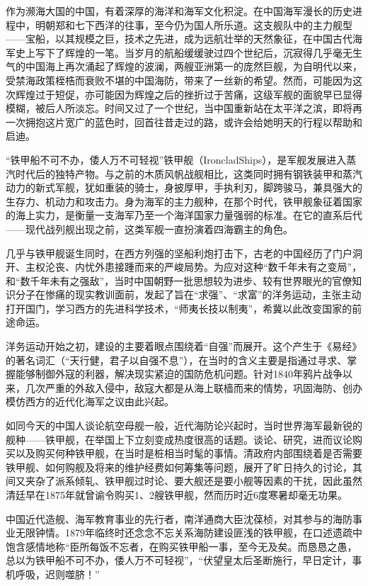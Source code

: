 \documentclass[12pt,UTF8]{ctexbook}
\begin{document}
作为濒海大国的中国，有着深厚的海洋和海军文化积淀。在中国海军漫长的历史进程中，明朝郑和七下西洋的往事，至今仍为国人所乐道。这支舰队中的主力舰型——宝船，以其规模之巨，技术之先进，成为远航壮举的天然象征，在中国古代海军史上写下了辉煌的一笔。当岁月的航船缓缓驶过四个世纪后，沉寂得几乎毫无生气的中国海上再次涌起了辉煌的波澜，两艘亚洲第一的庞然巨舰，为自明代以来，受禁海政策桎梏而衰败不堪的中国海防，带来了一丝新的希望。然而，可能因为这次辉煌过于短促，亦可能因为辉煌之后的挫折过于苦痛，这级军舰的面貌早已显得模糊，被后人所淡忘。时间又过了一个世纪，当中国重新站在太平洋之滨，即将再一次拥抱这片宽广的蓝色时，回首往昔走过的路，或许会给她明天的行程以帮助和启迪。

“铁甲船不可不办，倭人万不可轻视”铁甲舰（IroncladShips），是军舰发展进入蒸汽时代后的独特产物。与之前的木质风帆战舰相比，这类同时拥有钢铁装甲和蒸汽动力的新式军舰，犹如重装的骑士，身披厚甲，手执利刃，脚跨骏马，兼具强大的生存力、机动力和攻击力。身为海军的主力舰种，在那个时代，铁甲舰象征着国家的海上实力，是衡量一支海军乃至一个海洋国家力量强弱的标准。在它的直系后代——现代战列舰出现之前，这类军舰一直扮演着四海霸主的角色。

几乎与铁甲舰诞生同时，在西方列强的坚船利炮打击下，古老的中国经历了门户洞开、主权沦丧、内忧外患接踵而来的严峻局势。为应对这种“数千年未有之变局”，和“数千年未有之强敌”，当时中国朝野一批思想较为进步、较有世界眼光的官僚知识分子在惨痛的现实教训面前，发起了旨在“求强”、“求富”的洋务运动，主张主动打开国门，学习西方的先进科学技术，“师夷长技以制夷”，希冀以此改变国家的前途命运。

洋务运动开始之初，建设的主要着眼点围绕着“自强”而展开。这个产生于《易经》的著名词汇（“天行健，君子以自强不息”），在当时的含义主要是指通过寻求、掌握能够制御外寇的利器，解决现实紧迫的国防危机问题。针对1840年鸦片战争以来，几次严重的外敌入侵中，敌寇大都是从海上联樯而来的情势，巩固海防、创办模仿西方的近代化海军之议由此兴起。

如同今天的中国人谈论航空母舰一般，近代海防论兴起时，当时世界海军最新锐的舰种——铁甲舰，在举国上下立刻变成热度很高的话题。谈论、研究，进而议论购买以及购买何种铁甲舰，在当时是桩相当时髦的事情。清政府内部围绕着是否需要铁甲舰、如何购舰及将来的维护经费如何筹集等问题，展开了旷日持久的讨论，其间又夹杂了派系倾轧、铁甲舰过时论、要大舰还是要小舰等因素的干扰，因此虽然清廷早在1875年就曾谕令购买1、2艘铁甲舰，然而历时近6度寒暑却毫无功果。

中国近代造舰、海军教育事业的先行者，南洋通商大臣沈葆桢，对其参与的海防事业无限钟情。1879年临终时还念念不忘关系海防建设匪浅的铁甲舰，在口述遗疏中饱含感情地称“臣所每饭不忘者，在购买铁甲船一事，至今无及矣。而恳恳之愚，总以为铁甲船不可不办，倭人万不可轻视”，“伏望皇太后圣断施行，早日定计，事机呼吸，迟则噬脐！”
\end{document}
